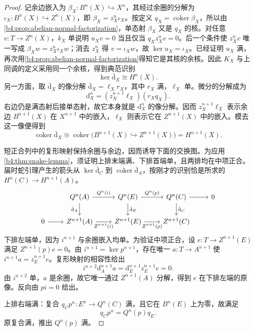 \begin{proof}
	记余边嵌入为 \(\beta_X:B^n(X)\hookrightarrow X^n\)，其经过余圈的分解为 \(\iota_X:B^n(X)\hookrightarrow Z^n(X)\)，即 \(\beta_X=z_X^n\iota_X\)。按定义 \(q_X=\operatorname{coker}\beta_X\)，所以由\cref{b4:prop:abelian-normal-factorization}，单态射 \(\beta_X\) 又是 \(q_X\) 的核。对任意 \(v:T\to Z^n(X)\)，\(k_X\) 单说明 \(u_Xv=0\) 当且仅当 \(q_Xz_X^nv=0\)。后一个条件使 \(z_X^nv\) 唯一写成 \(\beta_Xw=z_X^n\iota_Xw\)；消去 \(z_X^n\) 得 \(v=\iota_Xw\)，故 \(\ker u_X=\iota_X\)。已经证明 \(u_X\) 满，再次用\cref{b4:prop:abelian-normal-factorization}得知它是其核的余核。因此 \(K_X\) 与上同调的定义采用同一个余核，得到典范识别
	\[
		\ker\bar{\mathrm{d}}_X\cong H^n(X).
	\]
	另一方面，取 \(\bar{\mathrm{d}}_X\) 的像分解 \(\bar{\mathrm{d}}_X=\ell_Xr_X\)，其中 \(r_X\) 满，\(\ell_X\) 单。微分的分解成为
	\[
		\mathrm{d}_X^n=(z_X^{n+1}\ell_X)(r_Xq_X).
	\]
	右边仍是满态射后接单态射，故它本身就是 \(\mathrm{d}_X^n\) 的像分解。因而 \(z_X^{n+1}\ell_X\) 表示余边 \(B^{n+1}(X)\) 在 \(X^{n+1}\) 中的嵌入，\(\ell_X\) 则表示它在 \(Z^{n+1}(X)\) 中的嵌入。模去这一像便得到
	\[
		\operatorname{coker}\bar{\mathrm{d}}_X \cong\operatorname{coker}\bigl(B^{n+1}(X)\hookrightarrow Z^{n+1}(X)\bigr) =H^{n+1}(X).
	\]

	短正合列中的复形映射保持余圈与余边，因而诱导下面的交换图。为应用\cref{b4:thm:snake-lemma}，须证明上排末端满、下排首端单，且两排均在中项正合。届时蛇引理产生的箭头从 \(\ker\bar{\mathrm{d}}_C\) 到 \(\operatorname{coker}\bar{\mathrm{d}}_A\)，按刚才的识别恰是所求的 \(H^n(C)\to H^{n+1}(A)\)。
	\[
		\begin{tikzcd}[column sep=2.3em]
			&Q^n(A)\arrow[r,"Q^n(i)"]\arrow[d,"\bar{\mathrm{d}}_A"']&Q^n(E)\arrow[r,"Q^n(p)"]\arrow[d,"\bar{\mathrm{d}}_E"]&Q^n(C)\arrow[r]\arrow[d,"\bar{\mathrm{d}}_C"]&0\\
			0\arrow[r]&Z^{n+1}(A)\arrow[r,"Z^{n+1}(i)"']&Z^{n+1}(E)\arrow[r,"Z^{n+1}(p)"']&Z^{n+1}(C)&
		\end{tikzcd}
	\]
	下排左端单，因为 \(i^{n+1}\) 与余圈嵌入均单。为验证中项正合，设 \(e:T\to Z^{n+1}(E)\) 满足 \(Z^{n+1}(p)e=0\)。由 \(i^{n+1}=\ker p^{n+1}\)，存在唯一 \(a:T\to A^{n+1}\) 使 \(i^{n+1}a=z_E^{n+1}e\)。复形映射的相容性给出
	\[
		i^{n+2}\mathrm{d}_A^{n+1}a =\mathrm{d}_E^{n+1}z_E^{n+1}e=0.
	\]
	由 \(i^{n+2}\) 单，\(a\) 是余圈，故它唯一通过 \(Z^{n+1}(A)\) 分解，得到 \(e\) 在下排左端的原像。反向由 \(pi=0\) 给出。

	上排右端满：复合 \(q_Cp^n:E^n\to Q^n(C)\) 满，且它在 \(B^n(E)\) 上为零，故满足
	\[
		q_Cp^n=Q^n(p)q_E.
	\]
	原复合满，推出 \(Q^n(p)\) 满。


\end{proof}
